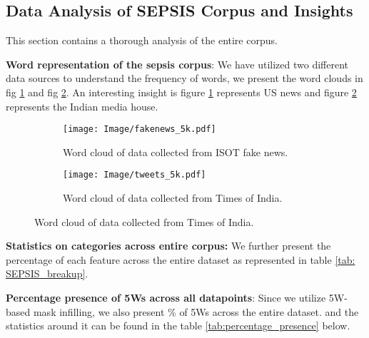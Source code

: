 \vspace{-2mm}
\subsection{Data Analysis of SEPSIS Corpus and Insights}\label{sec: data analysis}

This section contains a thorough analysis of the entire corpus.


\noindent
\textbf{Word representation of the sepsis corpus}: We have utilized two different data sources to understand the frequency of words, we present the word clouds in fig \ref{fig:fakenews-5k} and fig \ref{fig:tweets-5k}. An interesting insight is figure \ref{fig:fakenews-5k} represents US news and figure \ref{fig:tweets-5k} represents the Indian media house.

\begin{figure}[H]
  \centering
  \begin{subfigure}[b]{0.3\textwidth}
    \texttt{[image: Image/fakenews\_5k.pdf]}
    \caption{Word cloud of data collected from ISOT fake news.}
    \label{fig:fakenews-5k}
  \end{subfigure}
    \hspace{2cm}
    \begin{subfigure}[b]{0.3\textwidth}\texttt{[image: Image/tweets\_5k.pdf]}
    \caption{Word cloud of data collected from Times of India.}
    \label{fig:tweets-5k}
  \end{subfigure}
  \label{fig:combined_figure}
\end{figure}


\noindent
\textbf{Statistics on categories across entire corpus:}
We further present the percentage of each feature across the entire dataset as represented in table \ref{tab: SEPSIS_breakup}.













\noindent
\textbf{Percentage presence of 5Ws across all datapoints}:
Since we utilize 5W-based mask infilling, we also present \% of 5Ws across the entire dataset. and the statistics around it can be found in the table \ref{tab:percentage_presence} below.

